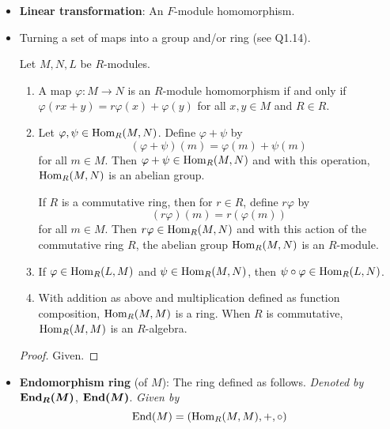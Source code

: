 \documentclass[../notes.tex]{subfiles}
\begin{document}
\begin{itemize}
\begin{enumerate}
\begin{itemize}
        \end{itemize}
    \end{enumerate}
    \item \textbf{Linear transformation}: An $F$-module homomorphism.
    \item Turning a set of maps into a group and/or ring (see Q1.14).
    \begin{proposition}\label{prp:10.2}
        Let $M,N,L$ be $R$-modules.
        \begin{enumerate}
            \item A map $\varphi:M\to N$ is an $R$-module homomorphism if and only if $\varphi(rx+y)=r\varphi(x)+\varphi(y)$ for all $x,y\in M$ and $R\in R$.
            \item Let $\varphi,\psi\in\operatorname{Hom}_R(M,N)$. Define $\varphi+\psi$ by
            \begin{equation*}
                (\varphi+\psi)(m) = \varphi(m)+\psi(m)
            \end{equation*}
            for all $m\in M$. Then $\varphi+\psi\in\operatorname{Hom}_R(M,N)$ and with this operation, $\operatorname{Hom}_R(M,N)$ is an abelian group.\par
            If $R$ is a commutative ring, then for $r\in R$, define $r\varphi$ by
            \begin{equation*}
                (r\varphi)(m) = r(\varphi(m))
            \end{equation*}
            for all $m\in M$. Then $r\varphi\in\operatorname{Hom}_R(M,N)$ and with this action of the commutative ring $R$, the abelian group $\operatorname{Hom}_R(M,N)$ is an $R$-module.
            \item If $\varphi\in\operatorname{Hom}_R(L,M)$ and $\psi\in\operatorname{Hom}_R(M,N)$, then $\psi\circ\varphi\in\operatorname{Hom}_R(L,N)$.
            \item With addition as above and multiplication defined as function composition, $\operatorname{Hom}_R(M,M)$ is a ring. When $R$ is commutative, $\operatorname{Hom}_R(M,M)$ is an $R$-algebra.
        \end{enumerate}
        \begin{proof}
            Given.
        \end{proof}
    \end{proposition}
    \item \textbf{Endomorphism ring} (of $M$): The ring defined as follows. \emph{Denoted by} $\bm{\End_R(M)}$, $\bm{\End(M)}$. \emph{Given by}
    \begin{equation*}
        \operatorname{End}(M) = (\operatorname{Hom}_R(M,M),+,\circ)
    \end{equation*}

\end{itemize}
\end{document}
